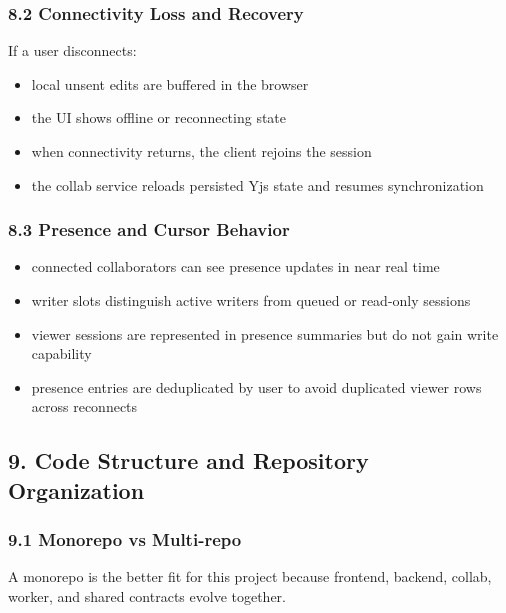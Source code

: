\documentclass[a4paper]{article}
\providecommand{\tightlist}{%
  \setlength{\itemsep}{0pt}\setlength{\parskip}{0pt}}
\begin{document}
\subsubsection{8.2 Connectivity Loss and
Recovery}\label{82-connectivity-loss-and-recovery}

If a user disconnects:

\begin{itemize}
\tightlist
\item
  local unsent edits are buffered in the browser
\item
  the UI shows offline or reconnecting state
\item
  when connectivity returns, the client rejoins the session
\item
  the collab service reloads persisted Yjs state and resumes
  synchronization
\end{itemize}

\subsubsection{8.3 Presence and Cursor
Behavior}\label{83-presence-and-cursor-behavior}

\begin{itemize}
\tightlist
\item
  connected collaborators can see presence updates in near real time
\item
  writer slots distinguish active writers from queued or read-only
  sessions
\item
  viewer sessions are represented in presence summaries but do not gain
  write capability
\item
  presence entries are deduplicated by user to avoid duplicated viewer
  rows across reconnects
\end{itemize}

\subsection{9. Code Structure and Repository
Organization}\label{9-code-structure-and-repository-organization}

\subsubsection{9.1 Monorepo vs
Multi-repo}\label{91-monorepo-vs-multi-repo}

A monorepo is the better fit for this project because frontend, backend,
collab, worker, and shared contracts evolve together.
\end{document}
